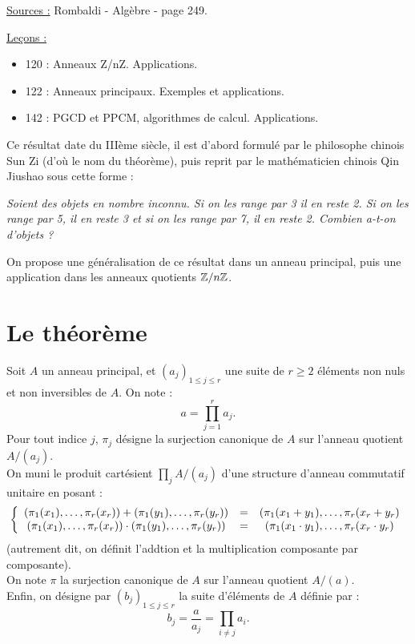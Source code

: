 

\pagestyle{fancy}

\fancyhead[R]{}



\underline{Sources :} Rombaldi - Algèbre - page 249. \newline

\underline{Leçons :} 
\begin{itemize}
\item 120 : Anneaux Z/nZ. Applications.
\item 122 : Anneaux principaux. Exemples et applications.
\item 142 : PGCD et PPCM, algorithmes de calcul. Applications.
\end{itemize}
\vspace{10pt}

Ce résultat date du IIIème siècle, il est d'abord formulé par le philosophe chinois Sun Zi (d'où le nom du théorème), 
puis reprit par le mathématicien chinois Qin Jiushao sous cette forme :

\begin{center}
\textit{Soient des objets en nombre inconnu. Si on les range par 3 il en reste 2. Si on les range par 5, il en reste 3 et si on les range par 7, il en reste 2. Combien a-t-on d'objets ?}
\end{center}

On propose une généralisation de ce résultat dans un anneau principal, puis une application dans les anneaux quotients $\mathbb{Z} / n\mathbb{Z}$.

\section{Le théorème}

\begin{nota}
Soit $A$ un anneau principal, et $(a_j)_{1 \leq j \leq r}$ une suite de $r \geq 2$ éléments non nuls et non inversibles de $A$. On note :
\[ a = \prod_{j=1}^r a_j . \]
Pour tout indice $j$, $\pi_j$ désigne la surjection canonique de $A$ sur l'anneau quotient $A / (a_j)$. \\
On muni le produit cartésient $\prod_j A / (a_j)$ d'une structure d'anneau commutatif unitaire en posant :
\[ \left \{ \begin{array}{c c c} 
(\pi_1(x_1), \dots, \pi_r (x_r)) + (\pi_1(y_1), \dots, \pi_r (y_r)) & = & ( \pi_1(x_1+y_1), \dots, \pi_r(x_r+y_r) \\
(\pi_1(x_1), \dots, \pi_r (x_r)) \cdot (\pi_1(y_1), \dots, \pi_r (y_r)) & = & ( \pi_1(x_1\cdot y_1), \dots, \pi_r(x_r \cdot y_r)
\end{array} \right. \]
(autrement dit, on définit l'addtion et la multiplication composante par composante). \\
On note $\pi$ la surjection canonique de $A$ sur l'anneau quotient $A/ (a)$. \\
Enfin, on désigne par $(b_j)_{1 \leq j \leq r}$ la suite d'éléments de $A$ définie par :
\[ b_j = \dfrac{a}{a_j} = \prod_{i \neq j} a_i . \]
\end{nota}

